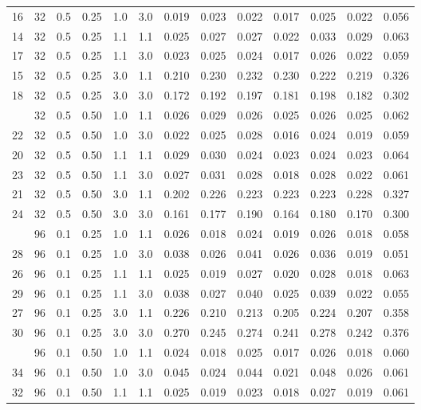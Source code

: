 \begin{longtable}[t]{ccccccrrrrrrc}
16 & 32 & 0.5 & 0.25 & 1.0 & 3.0 & 0.019 & 0.023 & 0.022 & 0.017 & 0.025 & 0.022 & 0.056\\
14 & 32 & 0.5 & 0.25 & 1.1 & 1.1 & 0.025 & 0.027 & 0.027 & 0.022 & 0.033 & 0.029 & 0.063\\
17 & 32 & 0.5 & 0.25 & 1.1 & 3.0 & 0.023 & 0.025 & 0.024 & 0.017 & 0.026 & 0.022 & 0.059\\
15 & 32 & 0.5 & 0.25 & 3.0 & 1.1 & 0.210 & 0.230 & 0.232 & 0.230 & 0.222 & 0.219 & 0.326\\
18 & 32 & 0.5 & 0.25 & 3.0 & 3.0 & 0.172 & 0.192 & 0.197 & 0.181 & 0.198 & 0.182 & 0.302\\
\addlinespace
19 & 32 & 0.5 & 0.50 & 1.0 & 1.1 & 0.026 & 0.029 & 0.026 & 0.025 & 0.026 & 0.025 & 0.062\\
22 & 32 & 0.5 & 0.50 & 1.0 & 3.0 & 0.022 & 0.025 & 0.028 & 0.016 & 0.024 & 0.019 & 0.059\\
20 & 32 & 0.5 & 0.50 & 1.1 & 1.1 & 0.029 & 0.030 & 0.024 & 0.023 & 0.024 & 0.023 & 0.064\\
23 & 32 & 0.5 & 0.50 & 1.1 & 3.0 & 0.027 & 0.031 & 0.028 & 0.018 & 0.028 & 0.022 & 0.061\\
21 & 32 & 0.5 & 0.50 & 3.0 & 1.1 & 0.202 & 0.226 & 0.223 & 0.223 & 0.223 & 0.228 & 0.327\\
24 & 32 & 0.5 & 0.50 & 3.0 & 3.0 & 0.161 & 0.177 & 0.190 & 0.164 & 0.180 & 0.170 & 0.300\\
\addlinespace
25 & 96 & 0.1 & 0.25 & 1.0 & 1.1 & 0.026 & 0.018 & 0.024 & 0.019 & 0.026 & 0.018 & 0.058\\
28 & 96 & 0.1 & 0.25 & 1.0 & 3.0 & 0.038 & 0.026 & 0.041 & 0.026 & 0.036 & 0.019 & 0.051\\
26 & 96 & 0.1 & 0.25 & 1.1 & 1.1 & 0.025 & 0.019 & 0.027 & 0.020 & 0.028 & 0.018 & 0.063\\
29 & 96 & 0.1 & 0.25 & 1.1 & 3.0 & 0.038 & 0.027 & 0.040 & 0.025 & 0.039 & 0.022 & 0.055\\
27 & 96 & 0.1 & 0.25 & 3.0 & 1.1 & 0.226 & 0.210 & 0.213 & 0.205 & 0.224 & 0.207 & 0.358\\
30 & 96 & 0.1 & 0.25 & 3.0 & 3.0 & 0.270 & 0.245 & 0.274 & 0.241 & 0.278 & 0.242 & 0.376\\
\addlinespace
31 & 96 & 0.1 & 0.50 & 1.0 & 1.1 & 0.024 & 0.018 & 0.025 & 0.017 & 0.026 & 0.018 & 0.060\\
34 & 96 & 0.1 & 0.50 & 1.0 & 3.0 & 0.045 & 0.024 & 0.044 & 0.021 & 0.048 & 0.026 & 0.061\\
32 & 96 & 0.1 & 0.50 & 1.1 & 1.1 & 0.025 & 0.019 & 0.023 & 0.018 & 0.027 & 0.019 & 0.061\\

\end{longtable}
